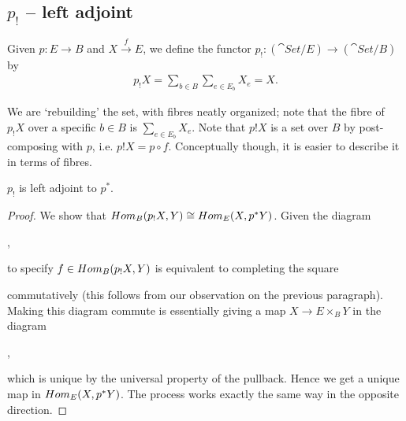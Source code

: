 \subsection{$p_!$ -- left adjoint}
Given $p: E\to B$ and $X\overset{f}{\to} E$, we define the functor $p_! : (\cat{Set}/ E)\to(\cat{Set}/ B)$ by
\begin{align*}
	p_!X = \sum_{b\in B} \sum_{e\in E_b} X_{e} = X.
\end{align*}

We are `rebuilding' the set, with fibres neatly organized; note that the fibre of $p_!X$ over a specific $b\in B$ is $\sum_{e\in E_b} X_e$. Note that $p!X$ is a set over $B$ by post-composing with $p$, i.e. $p!X = p \circ f$. Conceptually though, it is easier to describe it in terms of fibres.

\begin{proposition}
	$p_!$ is left adjoint to $p^*$.
\end{proposition}
\begin{proof}
	We show that $Hom_B(p_!X,Y) \cong Hom_E(X, p^*Y)$. Given the diagram
	\begin{center}
	,
	\end{center}
	to specify $f\in Hom_B(p_!X,Y)$ is equivalent to completing the square
	\begin{center}
	\end{center}
	commutatively (this follows from our observation on the previous paragraph). Making this diagram commute is essentially giving a map $X\to E\times_B Y$ in the diagram
	\begin{center}
	,
	\end{center}
	which is unique by the universal property of the pullback. Hence we get a unique map in $Hom_E(X,p^*Y)$. The process works exactly the same way in the opposite direction.
\end{proof}

\pagebreak
